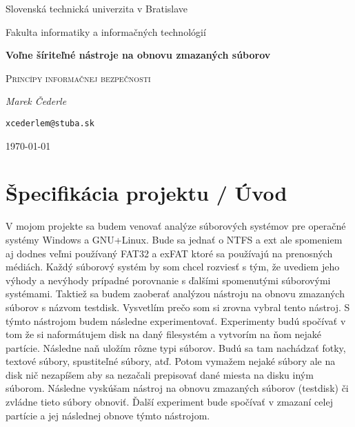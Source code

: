 \documentclass[12pt,oneside,slovak,a4paper]{article}
\begin{document}

\begin{titlepage}
	\centering
    {\Large Slovenská technická univerzita v Bratislave\par}
    {\Large Fakulta informatiky a informačných technológií\par}
	\vspace{7cm}
	{\huge\bfseries Voľne šíriteľné nástroje na obnovu zmazaných súborov\par}
	\vspace{0.5cm}
    {\Large \textsc{Princípy informačnej bezpečnosti}\par}
    \vspace{1cm}
	{\Large\itshape Marek Čederle\par}
    {\small\texttt{xcederlem@stuba.sk}\par}
	\vfill

	{\large \today\par}
\end{titlepage}


\tableofcontents
\vspace*{\fill}

\section{Špecifikácia projektu / Úvod}
V mojom projekte sa budem venovať analýze súborových systémov pre operačné systémy Windows a GNU+Linux. Bude sa jednať o NTFS a ext ale spomeniem aj dodnes veľmi používaný FAT32 a exFAT ktoré sa používajú na prenosných médiách. Každý súborový systém by som chcel rozviesť s tým, že uvediem jeho výhody a nevýhody prípadné porovnanie s ďalšími spomenutými súborovými systémami. Taktiež sa budem zaoberať analýzou nástroju na obnovu zmazaných súborov s názvom testdisk. Vysvetlím prečo som si zrovna vybral tento nástroj. S týmto nástrojom budem následne experimentovať. Experimenty budú spočívať v tom že si naformátujem disk na daný filesystém a vytvorím na ňom nejaké partície. Následne naň uložím rôzne typi súborov. Budú sa tam nachádzať fotky, textové súbory, spustiteľné súbory, atď. Potom vymažem nejaké súbory ale na disk nič nezapíšem aby sa nezačali prepisovať dané miesta na disku iným súborom. Následne vyskúšam nástroj na obnovu zmazaných súborov (testdisk) či zvládne tieto súbory obnoviť. Ďalší experiment bude spočívať v zmazaní celej partície a jej následnej obnove týmto nástrojom.
\end{document}
